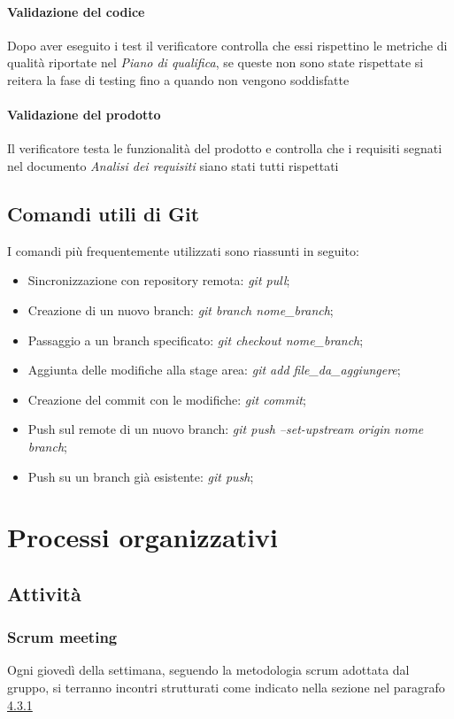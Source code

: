 \documentclass[12pt]{article}
\begin{document}
\paragraph{Validazione del codice}
Dopo aver eseguito i test il verificatore controlla che essi rispettino le metriche di qualità riportate nel \textit{Piano di qualifica}, se queste non sono state rispettate si reitera la fase di testing fino a quando non vengono soddisfatte

\paragraph{Validazione del prodotto}
Il verificatore testa le funzionalità del prodotto e controlla che i requisiti segnati nel documento \textit{Analisi dei requisiti} siano stati tutti rispettati

\subsection{Comandi utili di Git}
I comandi più frequentemente utilizzati sono riassunti in seguito:
\begin{itemize}
    \item Sincronizzazione con repository remota: \textit{git pull};
    \item Creazione di un nuovo branch: \textit{git branch nome\_branch};
    \item Passaggio a un branch specificato: \textit{git checkout nome\_branch};
    \item Aggiunta delle modifiche alla stage area: \textit{git add file\_da\_aggiungere};
    \item Creazione del commit con le modifiche: \textit{git commit};
    \item Push sul remote di un nuovo branch: \textit{git push --set-upstream origin nome branch};
    \item Push su un branch già esistente: \textit{git push};
\end{itemize}

\section{Processi organizzativi}
\subsection{Attività}
\subsubsection{Scrum meeting}
Ogni giovedì della settimana, seguendo la metodologia scrum adottata dal gruppo, si terranno incontri strutturati come indicato nella sezione nel paragrafo \hyperref[Sprint]{4.3.1} 
\end{document}
